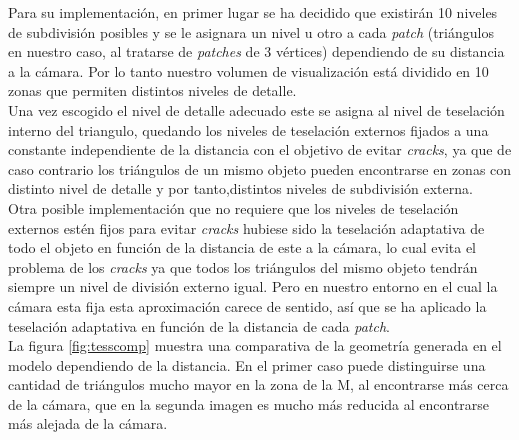 \documentclass[10pt,oneside,a4paper]{article}
\begin{document}
Para su implementación, en primer lugar se ha decidido que existirán 10 niveles de subdivisión posibles y se le asignara un nivel u otro a cada \textit{patch} (triángulos en nuestro caso, al tratarse de \textit{patches} de 3 vértices) dependiendo de su distancia a la cámara. Por lo tanto nuestro volumen de visualización está dividido en 10 zonas que permiten distintos niveles de detalle.\\

Una vez escogido el nivel de detalle adecuado este se asigna al nivel de teselación interno del triangulo, quedando los niveles de teselación externos fijados a una constante independiente de la distancia con el objetivo de evitar \textit{cracks}, ya que de caso contrario los triángulos de un mismo objeto pueden encontrarse en zonas con distinto nivel de detalle y por tanto,distintos niveles de subdivisión externa.\\

Otra posible implementación que no requiere que los niveles de teselación externos estén fijos para evitar \textit{cracks} hubiese sido la teselación adaptativa de todo el objeto en función de la distancia de este a la cámara, lo cual evita el problema de los \textit{cracks} ya que todos los triángulos del mismo objeto tendrán siempre un nivel de división externo igual. Pero en nuestro entorno en el cual la cámara esta fija esta aproximación carece de sentido, así que se ha aplicado la teselación adaptativa en función de la distancia de cada \textit{patch}.\\

La figura \ref{fig:tesscomp} muestra una comparativa de la geometría generada en el modelo dependiendo de la distancia. En el primer caso puede distinguirse una cantidad de triángulos mucho mayor en la zona de la M, al encontrarse más cerca de la cámara, que en la segunda imagen es mucho más reducida al encontrarse más alejada de la cámara.
\end{document}

